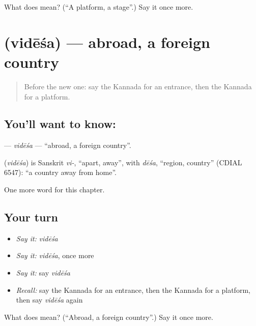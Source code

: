 \begin{tcolorbox}[breakable,colback=teal!4,colframe=teal!35!black,title={Before you move on}]
What does  mean? (\textquotedblleft{}A platform, a stage\textquotedblright{}.) Say it once more.
\end{tcolorbox}
\section[\texorpdfstring{\kn{ವಿದೇಶ} (vidēśa)}{ವಿದೇಶ (vidēśa)}]{ (vidēśa) — abroad, a foreign country}

\label{lesson:KA-C286-videsa}



\begin{quote}
Before the new one: say the Kannada for an entrance, then the Kannada for a platform.
\end{quote}

\subsection*{You'll want to know: }
\textbf{} — \emph{vidēśa} — \textquotedblleft{}abroad, a foreign country\textquotedblright{}.

\begin{cousinweb}
\textbf{} (\emph{vidēśa}) is Sanskrit \emph{vi-}, \textquotedblleft{}apart, away\textquotedblright{}, with \emph{dēśa}, \textquotedblleft{}region, country\textquotedblright{} (CDIAL 6547): \textquotedblleft{}a country away from home\textquotedblright{}.
\end{cousinweb}

\begin{grammarlens}[title={What you've built}]
One more word for this chapter.
\end{grammarlens}

\subsection*{Your turn}
\begin{itemize}
\raggedright
  \item \emph{Say it:} \emph{vidēśa}
  \item \emph{Say it:} \emph{vidēśa}, once more
  \item \emph{Say it:} say \emph{vidēśa}
  \item \emph{Recall:} say the Kannada for an entrance, then the Kannada for a platform, then say \emph{vidēśa} again
\end{itemize}

\begin{tcolorbox}[breakable,colback=teal!4,colframe=teal!35!black,title={Before you move on}]
What does  mean? (\textquotedblleft{}Abroad, a foreign country\textquotedblright{}.) Say it once more.
\end{tcolorbox}
